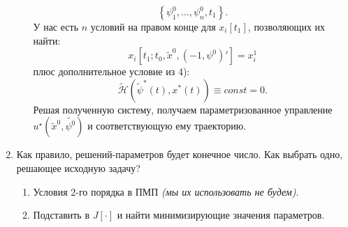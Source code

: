 \begin{enumerate}
\begin{enumerate}
        $$
            \left\{ \psi^0_1, \ldots, \psi^0_n, t_1 \right\}.
        $$
        У нас есть $n$ условий на правом конце для $x_i[t_1]$, позволяющих их найти:
        $$
            x_i[t_1; t_0, \tilde{x}^0, (-1, \psi^0)'] = x_i^1
        $$
        плюс дополнительное условие из 4):
        $$
            \tilde{\mathscr{H}}(\tilde{\psi}^*(t), x^*(t)) \equiv const = 0.
        $$
        Решая полученную систему, получаем параметризованное управление $u^{\star}(\tilde{x}^0, \tilde{\psi^0})$ и соответствующую ему траекторию.
    \end{enumerate}
    \item Как правило, решений-параметров будет конечное число. Как выбрать одно, решающее исходную задачу?
        \begin{enumerate}
            \item Условия 2-го порядка в ПМП \textit{(мы их использовать не будем)}.
            \item Подставить в $J[\cdot]$ и найти минимизирующие значения параметров.
        \end{enumerate}
    \end{enumerate}

